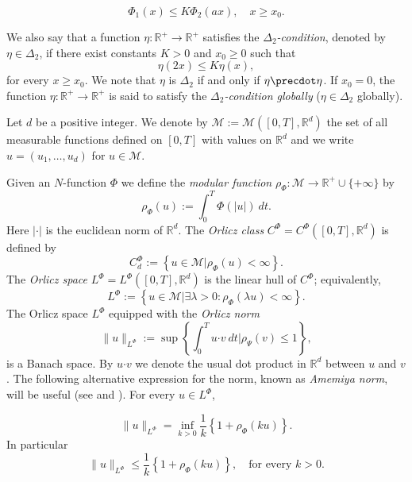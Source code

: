 \documentclass[twoside]{article}
\theoremstyle{remark}
\newcommand{\orlnor}{\|_{L^{\Phi}}}
\newcommand{\lphi}{L^{\Phi}}
\newcommand{\claseor}{C^{\Phi}}
\renewcommand{\b}[1]{\boldsymbol{#1}}
\newcommand{\rr}{\mathbb{R}}
\renewcommand{\leq}{\leqslant}
\renewcommand{\geq}{\geqslant}
\begin{document}
\begin{equation}\label{eq:prec2}\Phi_1(x)\leq K\Phi_2(ax), \quad x\geq x_0.\end{equation}


We also say that a function $\eta:\mathbb{R}^+\rightarrow \mathbb{R}^+$ satisfies the  \emph{$\Delta_2$-condition}, denoted by $\eta \in \Delta_2$,
if there exist  constants $K>0$ and  $x_0\geq 0$ such that
\begin{equation}\label{delta2defi}\eta(2x)\leq K\eta(x),
\end{equation}
for every $x\geq x_0$. We note that $\eta$ is $\Delta_2$ if and only if $\eta\precdot\eta$.
If $x_0=0$,  the function   $\eta:\mathbb{R}^+\rightarrow \mathbb{R}^+$ is said to satisfy the \emph{$\Delta_2$-condition globally} ($\eta \in \Delta_2$ globally).


Let $d$ be a positive integer. We denote by $\mathcal{M}:=\mathcal{M}([0,T],\rr^d)$ the set of all measurable functions defined on $[0,T]$ with values on $\mathbb{R}^d$ and  we write $u=(u_1,\dots,u_d)$ for  $u\in \mathcal{M}$.



Given  an $N$-function $\Phi$ we define the \emph{modular function} 
$\rho_{\Phi}:\mathcal{M}\to \mathbb{R}^+\cup\{+\infty\}$ by
\[\rho_{\Phi}(u):= \int_0^T \Phi(|u|)\ dt.\]
Here $|\cdot|$ is the euclidean norm of $\mathbb{R}^d$.
The \emph{Orlicz class} $C^{\Phi}=C^{\Phi}([0,T],\rr^d)$  is defined  by
\begin{equation}\label{claseOrlicz}
  C^{\Phi}_d:=\left\{u\in \mathcal{M} | \rho_{\Phi}(u)< \infty \right\}.
\end{equation}
The \emph{Orlicz space} $\lphi=L^{\Phi}([0,T],\rr^d)$ is the linear hull of $\claseor$;
equivalently,
\begin{equation}\label{espacioOrlicz}
\lphi:=\left\{ u\in \mathcal{M}| \exists \lambda>0: \rho_{\Phi}(\lambda u) < \infty   \right\}.
\end{equation}
  The Orlicz space $\lphi$ equipped with the \emph{Orlicz norm}
\[
\|  u  \orlnor:=\sup \left\{  \int_0^T u\b{\cdot} v\ dt \big| \rho_{\Psi}(v)\leq 1\right\},
\]
is a Banach space. By $u\b{\cdot} v$ we denote the usual dot product in $\mathbb{R}^{d}$ between $u$ and $v$.
The following alternative expression for the norm, known as \emph{Amemiya norm},     will  be useful (see \cite[Thm. 10.5]{KR} and \cite{hudzik2000amemiya}). For every $u\in\lphi$,

\begin{equation}\label{amemiya}
\|u\orlnor=\inf\limits_{k>0}\frac{1}{k}\left\{1+\rho_{\Phi}(ku)\right\}.
\end{equation}
In particular
\begin{equation}\label{amemiya-ine}
\|u\orlnor\leq \frac{1}{k}\left\{1+\rho_{\Phi}(ku)\right\},\quad\text{for every } k>0.
\end{equation}
\end{document}
